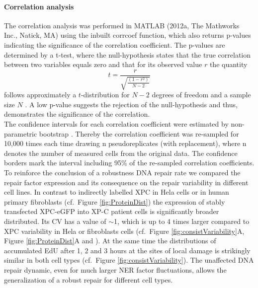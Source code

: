 \paragraph{Correlation analysis}
The correlation analysis was performed in MATLAB (2012a, The Mathworks Inc., Natick, MA) using the inbuilt corrcoef function, which also returns p-values indicating the significance of the correlation coefficient. The p-values are determined by a t-test, where the null-hypothesis states that the true correlation between two variables equals zero and that for its observed value $r$ the quantity 
\begin{equation}
	t = \frac{r}{\sqrt{\frac{(1-r^2)}{N-2}}}
\end{equation}     
follows approximately a $t$-distribution for $N-2$ degrees of freedom and a sample size $N$ \cite{Kendall1979,Fisher1958}. A low p-value suggests the rejection of the null-hypothesis and thus, demonstrates the significance of the correlation.\\
The confidence intervals for each correlation coefficient were estimated by non-parametric bootstrap \cite{Efron1979}. Thereby the correlation coefficient was re-sampled for 10,000 times each time drawing n pseudoreplicates (with replacement), where n denotes the number of measured cells from the original data. The confidence borders mark the interval including 95\% of the re-sampled correlation coefficients.\\       

To reinforce the conclusion of a robustness DNA repair rate we compared the repair factor expression and its consequence on the repair variability in different cell lines. In contrast to indirectly labelled XPC in Hela cells \cite{Verbruggen2014} or in human primary fibroblasts (cf.\ Figure \ref{fig:ProteinDist}) the expression of stably transfected XPC-eGFP into XP-C patient cells is significantly broader distributed. Its CV has a value of $\sim$1, which is up to 4 times larger compared to XPC variability in Hela or fibroblasts cells (cf.\ Figure \ref{fig:consistVariability}A, Figure \ref{fig:ProteinDist}A and \cite{Verbruggen2014}). At the same time the distributions of accumulated EdU after 1, 2 and 3 hours at the sites of local damage is strikingly similar in both cell types (cf.\ Figure \ref{fig:consistVariability}). The unaffected DNA repair dynamic, even for much larger NER factor fluctuations, allows the generalization of a robust repair for different cell types.  


